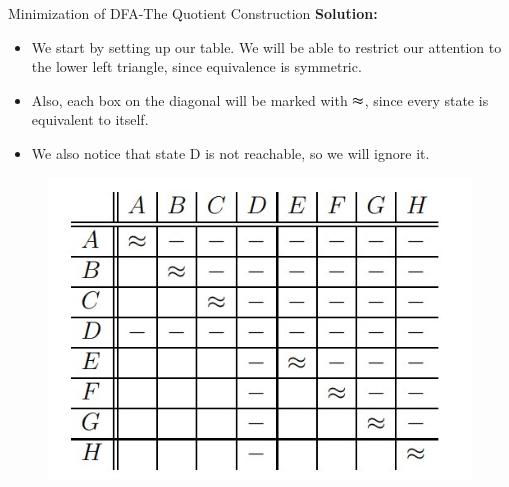 \documentclass{beamer}
\begin{document}
\begin{frame}{Minimization of DFA-The Quotient Construction}
	\textbf{Solution:}
\begin{itemize}
	\item We start by setting up our table. We will be able to restrict our attention
	to the lower left triangle, since equivalence is symmetric.
	\item Also, each box
	on the diagonal will be marked with $ \thickapprox $, since every state is equivalent to
	itself.
	\item  We also notice that state D is not reachable, so we will ignore it.

\end{itemize}
\begin{figure}
	\includegraphics[scale=.6]{img2/m14}
\end{figure}
\end{frame}
\end{document}

